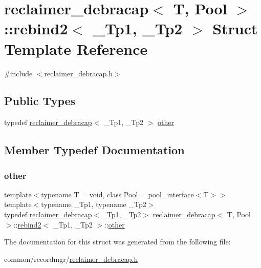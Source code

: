 \hypertarget{structreclaimer__debracap_1_1rebind2}{}\section{reclaimer\+\_\+debracap$<$ T, Pool $>$\+:\+:rebind2$<$ \+\_\+\+Tp1, \+\_\+\+Tp2 $>$ Struct Template Reference}
\label{structreclaimer__debracap_1_1rebind2}


{\ttfamily \#include $<$reclaimer\+\_\+debracap.\+h$>$}

\subsection*{Public Types}
\begin{DoxyCompactItemize}
\item 
typedef \hyperlink{classreclaimer__debracap}{reclaimer\+\_\+debracap}$<$ \+\_\+\+Tp1, \+\_\+\+Tp2 $>$ \hyperlink{structreclaimer__debracap_1_1rebind2_ab696f9c94d708ccefb34cc161cdcc9af}{other}
\end{DoxyCompactItemize}


\subsection{Member Typedef Documentation}
\mbox{\label{structreclaimer__debracap_1_1rebind2_ab696f9c94d708ccefb34cc161cdcc9af}} 
\subsubsection{\texorpdfstring{other}{other}}
{\footnotesize\ttfamily template$<$typename T  = void, class Pool  = pool\+\_\+interface$<$\+T$>$$>$ \\
template$<$typename \+\_\+\+Tp1, typename \+\_\+\+Tp2$>$ \\
typedef \hyperlink{classreclaimer__debracap}{reclaimer\+\_\+debracap}$<$\+\_\+\+Tp1, \+\_\+\+Tp2$>$ \hyperlink{classreclaimer__debracap}{reclaimer\+\_\+debracap}$<$ T, Pool $>$\+::\hyperlink{structreclaimer__debracap_1_1rebind2}{rebind2}$<$ \+\_\+\+Tp1, \+\_\+\+Tp2 $>$\+::\hyperlink{structreclaimer__debracap_1_1rebind2_ab696f9c94d708ccefb34cc161cdcc9af}{other}}



The documentation for this struct was generated from the following file\+:\begin{DoxyCompactItemize}
\item 
common/recordmgr/\hyperlink{reclaimer__debracap_8h}{reclaimer\+\_\+debracap.\+h}\end{DoxyCompactItemize}
